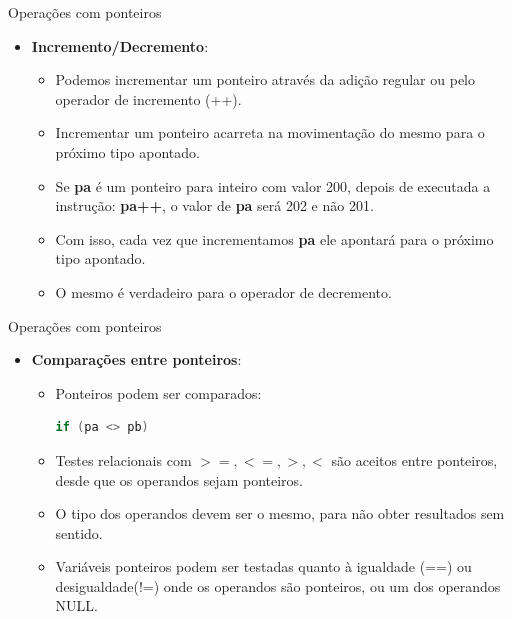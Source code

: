 \begin{frame}[fragile,c]{Operações com ponteiros}  
  \begin{itemize}[<+->]
    \item \textbf{Incremento/Decremento}:
    \begin{itemize}[<+->]
      \item Podemos incrementar um ponteiro através da adição regular ou pelo operador de incremento (++).
      \item Incrementar um ponteiro acarreta na movimentação do mesmo para o próximo tipo apontado.
      \item Se \textbf{pa} é um ponteiro para inteiro com valor 200, depois de executada a instrução: \textbf{pa++}, o valor de \textbf{pa} será 202 e não 201.
      \item Com isso, cada vez que incrementamos \textbf{pa} ele apontará para o próximo tipo apontado.
      \item O mesmo é verdadeiro para o operador de decremento. 
    \end{itemize}
  \end{itemize}
\end{frame}

\begin{frame}[fragile,c]{Operações com ponteiros}  
  \begin{itemize}[<+->]
    \item \textbf{Comparações entre ponteiros}:
    \begin{itemize}[<+->]
      \item Ponteiros podem ser comparados:
\begin{lstlisting}[language=C]
  if (pa <> pb)
\end{lstlisting}
      \item Testes relacionais com $>=, <=, >, <$ são aceitos entre ponteiros, desde que os operandos sejam ponteiros.
      \item \alert{O tipo dos operandos devem ser o mesmo, para não obter resultados sem sentido}.
      \item Variáveis ponteiros podem ser testadas quanto à igualdade (==) ou desigualdade(!=) onde os operandos são ponteiros, ou um dos operandos NULL.
    \end{itemize}
  \end{itemize}
\end{frame}

